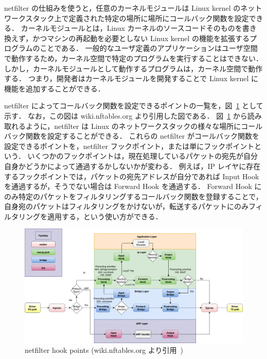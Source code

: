 netfilter の仕組みを使うと，任意のカーネルモジュールは Linux kernel のネットワークスタック上で定義された特定の場所に場所にコールバック関数を設定できる．
カーネルモジュールとは，Linux カーネルのソースコードそのものを書き換えず，かつマシンの再起動を必要としない Linux kernel の機能を拡張するプログラムのことである．
一般的なユーザ定義のアプリケーションはユーザ空間で動作するため，カーネル空間で特定のプログラムを実行することはできない．
しかし，カーネルモジュールとして動作するプログラムは，カーネル空間で動作する．
つまり，開発者はカーネルモジュールを開発することで Linux kernel に機能を追加することができる．

netfilter によってコールバック関数を設定できるポイントの一覧を，図~\ref*{fig:nf-hooks} として示す．
なお，この図は wiki.nftables.org より引用した図である．
図~\ref*{fig:nf-hooks} から読み取れるように，netfilter は Linux のネットワークスタックの様々な場所にコールバック関数を設定することができる．
これらの netfilter がコールバック関数を設定できるポイントを，netfilter フックポイント，または単にフックポイントという．
いくつかのフックポイントは，現在処理しているパケットの宛先が自分自身かどうかによって通過するかしないかが変わる．
例えば，IP レイヤに存在するフックポイントでは，パケットの宛先アドレスが自分であれば Input Hook を通過するが，そうでない場合は Forward Hook を通過する．
Forward Hook にのみ特定のパケットをフィルタリングするコールバック関数を登録することで，自身宛のパケットはフィルタリングをかけないが，転送するパケットにのみフィルタリングを適用する，という使い方ができる．

\begin{figure}[t]
    \centering
    \includegraphics[width=0.95\linewidth]{img/nf-hooks.pdf}
    \caption{netfilter hook points (wiki.nftables.org より引用~\cite{nf-hooks})}
    \label{fig:nf-hooks}
\end{figure}

